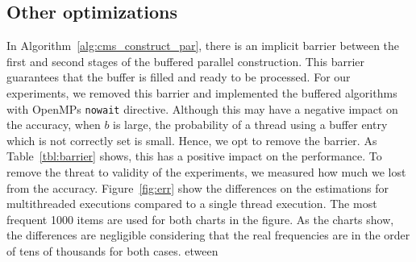 \documentclass[10pt, conference, compsocconf]{IEEEtran}
\begin{document}
\subsection{Other optimizations}

In Algorithm~\ref{alg:cms_construct_par}, there is an implicit barrier between the first and second stages of the buffered parallel construction. This barrier guarantees that the buffer is filled and ready to be processed. For our experiments, we removed this barrier and implemented the buffered algorithms with OpenMPs {\tt nowait} directive. Although this may have a negative impact on the accuracy, when $b$ is large, the probability of a thread using a buffer entry which is not correctly set is small. Hence, we opt to remove the barrier. As Table~\ref{tbl:barrier} shows, this has a positive impact on the performance. To remove the threat to validity of the experiments, we measured how much we lost from the accuracy. Figure~\ref{fig:err} show the differences on the estimations for multithreaded executions compared to a single thread execution. The most frequent 1000 items are used for both charts in the figure. As the charts show, the differences are negligible considering that the real frequencies are in the order of tens of thousands for both cases.   
etween 
\end{document}
